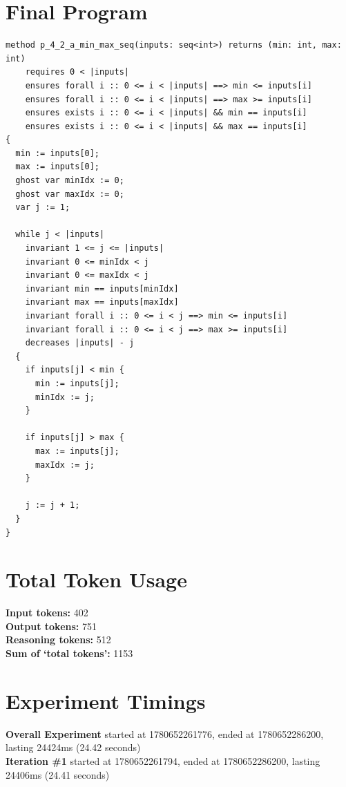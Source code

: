 \documentclass{article}
\begin{document}
\section*{Final Program}
\begin{lstlisting}
method p_4_2_a_min_max_seq(inputs: seq<int>) returns (min: int, max: int)
	requires 0 < |inputs|
	ensures forall i :: 0 <= i < |inputs| ==> min <= inputs[i]
	ensures forall i :: 0 <= i < |inputs| ==> max >= inputs[i]
	ensures exists i :: 0 <= i < |inputs| && min == inputs[i]
	ensures exists i :: 0 <= i < |inputs| && max == inputs[i]
{
  min := inputs[0];
  max := inputs[0];
  ghost var minIdx := 0;
  ghost var maxIdx := 0;
  var j := 1;

  while j < |inputs|
    invariant 1 <= j <= |inputs|
    invariant 0 <= minIdx < j
    invariant 0 <= maxIdx < j
    invariant min == inputs[minIdx]
    invariant max == inputs[maxIdx]
    invariant forall i :: 0 <= i < j ==> min <= inputs[i]
    invariant forall i :: 0 <= i < j ==> max >= inputs[i]
    decreases |inputs| - j
  {
    if inputs[j] < min {
      min := inputs[j];
      minIdx := j;
    }

    if inputs[j] > max {
      max := inputs[j];
      maxIdx := j;
    }

    j := j + 1;
  }
}
\end{lstlisting}
\section*{Total Token Usage}
\textbf{Input tokens: }402
\\\textbf{Output tokens: }751
\\\textbf{Reasoning tokens: }512
\\\textbf{Sum of `total tokens': }1153
\section*{Experiment Timings}
\textbf{Overall Experiment} started at 1780652261776, ended at 1780652286200, lasting 24424ms (24.42 seconds)
\\\textbf{Iteration \#1} started at 1780652261794, ended at 1780652286200, lasting 24406ms (24.41 seconds)
\end{document}

